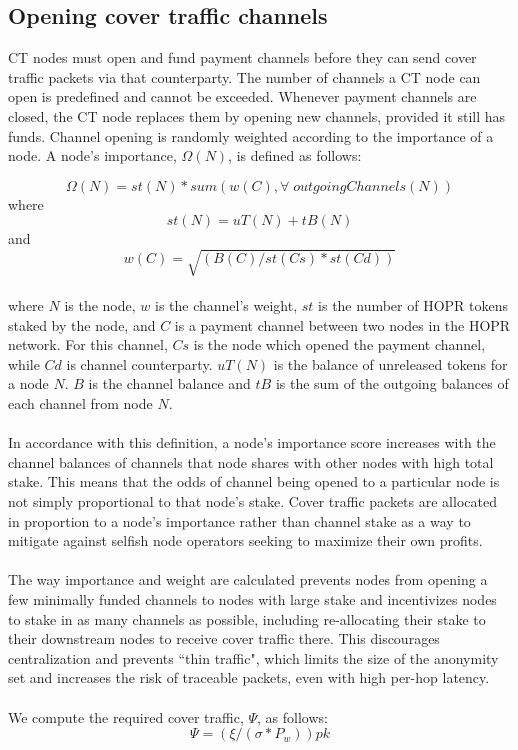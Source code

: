 \subsection{Opening cover traffic channels} 
CT nodes must open and fund payment channels before they can send cover traffic packets via that counterparty. The number of channels a CT node can open is predefined and cannot be exceeded. Whenever payment channels are closed, the CT node replaces them by opening new channels, provided it still has funds. Channel opening is randomly weighted according to the importance of a node. A node's importance, $\Omega(N)$, is defined as follows:

$$\Omega(N) = st(N) * sum(w(C), \forall \; outgoingChannels(N))$$
where 
$$st(N) = uT(N) + tB(N)$$
and 
$$w(C) = \sqrt{(B(C) / st(Cs) * st(Cd))}$$
\\
where $N$ is the node, $w$ is the channel's weight, $st$ is the number of HOPR tokens staked by the node, and $C$ is a payment channel between two nodes in the HOPR network. For this channel, $Cs$ is the node which opened the payment channel, while $Cd$ is channel counterparty. $uT(N)$ is the balance of unreleased tokens for a node $N$. $B$ is the channel balance and $tB$ is the sum of the outgoing balances of each channel from node $N$.
\\~\\ In accordance with this definition, a node's importance score increases with the channel balances of channels that node shares with other nodes with high total stake. This means that the odds of channel being opened to a particular node is not simply proportional to that node’s stake. Cover traffic packets are allocated in proportion to a node's importance rather than channel stake as a way to mitigate against selfish node operators seeking to maximize their own profits.
\\~\\The way importance and weight are calculated prevents nodes from opening a few minimally funded channels to nodes with large stake and incentivizes nodes to stake in as many channels as possible,  including re-allocating their stake to their downstream nodes to receive cover traffic there. This discourages centralization and prevents ``thin traffic", which limits the size of the anonymity set and increases the risk of traceable packets, even with high per-hop latency.
\\~\\ We compute the required cover traffic, $\Psi$, as follows:
$$\Psi= ( \xi/ (\sigma * P_w)) pk$$
